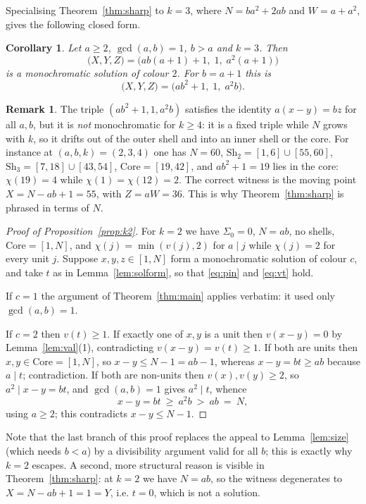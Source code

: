 \documentclass{amsart}
\newtheorem{corollary}[theorem]{Corollary}
\theoremstyle{definition}
\newtheorem{remark}[theorem]{Remark}
\newcommand{\Sh}{\mathrm{Sh}}
\newcommand{\Core}{\mathrm{Core}}
\begin{document}
Specialising Theorem~\ref{thm:sharp} to $k=3$, where
$N=ba^{2}+2ab$ and $W=a+a^{2}$, gives the following closed form.

\begin{corollary}\label{cor:k3}
Let $a\ge2$, $\gcd(a,b)=1$, $b>a$ and $k=3$.  Then
\[
  \bigl(X,Y,Z\bigr)=\bigl(ab(a+1)+1,\;1,\;a^{2}(a+1)\bigr)
\]
is a monochromatic solution of colour $2$.  For $b=a+1$ this is
\[
  \bigl(X,Y,Z\bigr)=\bigl(ab^{2}+1,\;1,\;a^{2}b\bigr).
\]
\end{corollary}

\begin{remark}\label{rem:notfixed}
The triple $(ab^{2}+1,1,a^{2}b)$ satisfies the identity $a(x-y)=bz$ for all
$a,b$, but it is \emph{not} monochromatic for $k\ge4$: it is a fixed triple
while $N$ grows with $k$, so it drifts out of the outer shell and into an inner
shell or the core.  For instance at $(a,b,k)=(2,3,4)$ one has $N=60$,
$\Sh_2=[1,6]\cup[55,60]$, $\Sh_3=[7,18]\cup[43,54]$, $\Core=[19,42]$, and
$ab^{2}+1=19$ lies in the core: $\chi(19)=4$ while
$\chi(1)=\chi(12)=2$.  The correct witness is the moving point
$X=N-ab+1=55$, with $Z=aW=36$.  This is why Theorem~\ref{thm:sharp} is phrased
in terms of $N$.
\end{remark}

\begin{proof}[Proof of Proposition~\ref{prop:k2}]
For $k=2$ we have $\Sigma_0=0$, $N=ab$, no shells, $\Core=[1,N]$, and
$\chi(j)=\min(v(j),2)$ for $a\mid j$ while $\chi(j)=2$ for every unit $j$.
Suppose $x,y,z\in[1,N]$ form a monochromatic solution of colour $c$, and take
$t$ as in Lemma~\ref{lem:solform}, so that \eqref{eq:pin} and \eqref{eq:vt}
hold.

If $c=1$ the argument of Theorem~\ref{thm:main} applies verbatim: it used only
$\gcd(a,b)=1$.

If $c=2$ then $v(t)\ge1$.  If exactly one of $x,y$ is a unit then
$v(x-y)=0$ by Lemma~\ref{lem:val}(1), contradicting $v(x-y)=v(t)\ge1$.  If both
are units then $x,y\in\Core=[1,N]$, so $x-y\le N-1=ab-1$, whereas
$x-y=bt\ge ab$ because $a\mid t$; contradiction.  If both are non-units then
$v(x),v(y)\ge2$, so $a^{2}\mid x-y=bt$, and $\gcd(a,b)=1$ gives $a^{2}\mid t$,
whence
\[
  x-y=bt\ \ge\ a^{2}b\ >\ ab\ =\ N ,
\]
using $a\ge2$; this contradicts $x-y\le N-1$.
\end{proof}

Note that the last branch of this proof replaces the appeal to
Lemma~\ref{lem:size} (which needs $b<a$) by a divisibility argument valid for
all $b$; this is exactly why $k=2$ escapes.  A second, more structural reason
is visible in Theorem~\ref{thm:sharp}: at $k=2$ we have $N=ab$, so the witness
degenerates to $X=N-ab+1=1=Y$, i.e. $t=0$, which is not a solution.
\end{document}
